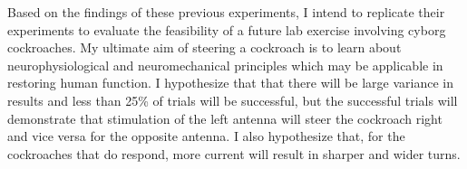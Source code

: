 
Based on the findings of these previous experiments, I intend to replicate their experiments to evaluate the feasibility of a future lab exercise involving cyborg cockroaches. My ultimate aim of steering a cockroach is to learn about neurophysiological and neuromechanical principles which may be applicable in restoring human function. I hypothesize that that there will be large variance in results and less than 25\% of trials will be successful, but the successful trials will demonstrate that stimulation of the left antenna will steer the cockroach right and vice versa for the opposite antenna. I also hypothesize that, for the cockroaches that do respond, more current will result in sharper and wider turns.







